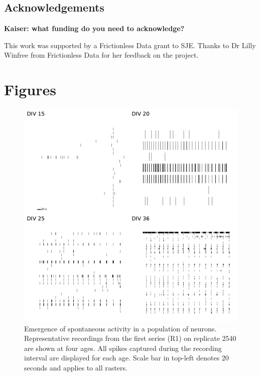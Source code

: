 \documentclass[doublespacing]{bmcart}
\begin{document}
\begin{backmatter}

\subsection*{Acknowledgements}
\textbf{Kaiser: what funding do you need to acknowledge?}

This work was supported by a Frictionless Data grant to SJE\@.  Thanks
to Dr Lilly Winfree from Frictionless Data for her feedback on the
project.





\clearpage
\section*{Figures}
\begin{figure}[h!]
  \includegraphics{../plots/supplementary_figures/raster_plots.pdf}
  \caption{Emergence of spontaneous activity in a population of neurons. Representative recordings from the first series (R1) on replicate 2540 are shown at four ages. All spikes captured during the recording interval are displayed for each age.  Scale bar in top-left denotes 20 seconds and applies to all rasters.}
  \label{fig:rasters}
\end{figure}


\end{backmatter}
\end{document}

